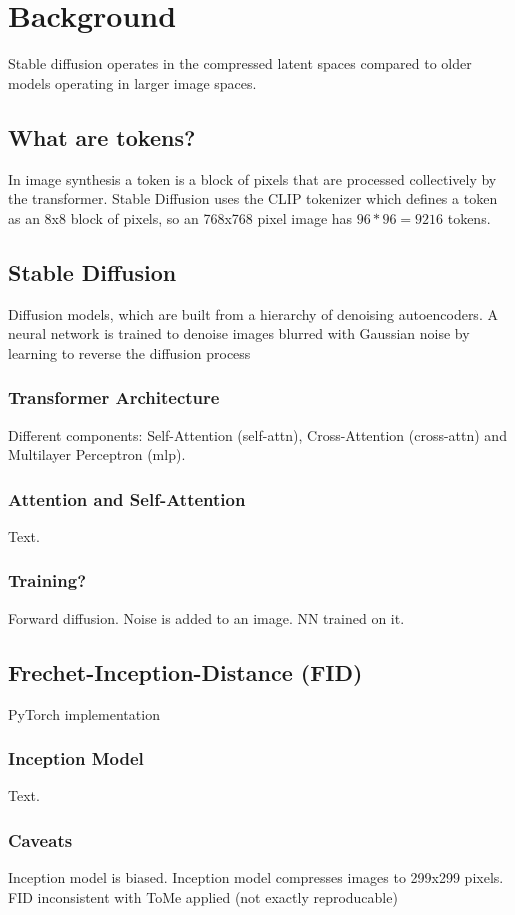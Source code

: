 \section{Background}
Stable diffusion operates in the compressed latent spaces compared to older models operating in larger image spaces.

\subsection{What are tokens?}
In image synthesis a token is a block of pixels that are processed collectively by the transformer. Stable Diffusion uses the CLIP tokenizer\cite{radford2021learning} which defines a token as an 8x8 block of pixels, so an 768x768 pixel image has \(96*96=9216\) tokens.

\subsection{Stable Diffusion}
Diffusion models, which are built from a hierarchy of
denoising autoencoders. A neural network is trained to denoise images blurred with Gaussian noise by learning to reverse the diffusion process

\subsubsection{Transformer Architecture}
Different components: Self-Attention (self-attn), Cross-Attention (cross-attn) and Multilayer Perceptron (mlp).

\subsubsection{Attention and Self-Attention}
Text.

\subsubsection{Training?}
Forward diffusion. Noise is added to an image. NN trained on it.

\subsection{Frechet-Inception-Distance (FID)}
PyTorch implementation\cite{Seitzer2020FID}

\subsubsection{Inception Model}
Text.

\subsubsection{Caveats}
Inception model is biased. Inception model compresses images to 299x299 pixels. FID inconsistent with ToMe applied (not exactly reproducable)